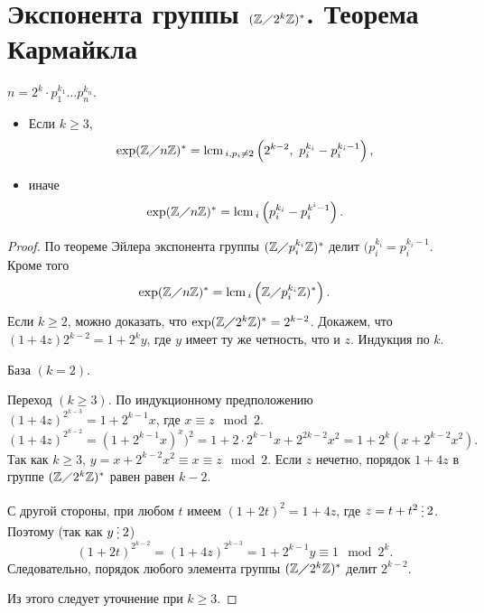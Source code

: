 \documentclass[11pt]{book}
\newcommand{\Z}{\mathbb{Z}}
\newcommand{\po}{\diagup}
\newcommand{\lcm}{{\mathop{\text{\rm lcm}}\,}}
\newcommand{\del}{{\:\small \raisebox{-2pt}{\vdots}\:}}
\renewcommand{\ge}{\geqslant}
\theoremstyle{definition}
\theoremstyle{plain}
\theoremstyle{plain}
\theoremstyle{definition}
\theoremstyle{remark}
\begin{document}
 \section{Экспонента группы $ (\Z \po 2^{k}\Z)^{*}$. Теорема Кармайкла }
 \begin{thm}[Кармайкла]
     $ n = 2^{k} \cdot p_1^{k_1} \ldots p_n^{k_n}$.
     \begin{itemize}
	 \item Если  $ k \ge 3$,
      \[
	  \exp (\Z \po n\Z)^{*} = \lcm_{i, p_i \ne 2}\left(2^{k-2},~ p_i^{k_i} - p_i^{k_i-1}\right)
     ,\] 
 \item иначе
     \[
	 \exp (\Z \diagup n \Z)^{*}= \lcm _i \left(p_i^{k_i} - p_i^{k^{i}-1}\right)
     .\] 
     \end{itemize}
 \end{thm}
 \begin{proof}
     По теореме Эйлера экспонента группы $ (\Z\po p_{i}^{k_i} \Z)^{*}$ делит $ (p_i^{k_i} = p_{i}^{k_i -1}$. Кроме того 
     \[
     \exp (\Z\po n\Z)^{*} = \lcm_i \left(\Z \po p_{i}^{k_i}\Z)^{*}\right)
     .\] 
     Если $ k \ge 2$, можно доказать, что $ \exp (\Z\po 2^{k}\Z)^{*}  = 2^{k-2}$.
     Докажем, что $ (1 + 4z)2^{k-2} = 1+2^{k} y$, где $ y$  имеет ту же четность, что и $ z$.
     Индукция по $ k$.
      \begin{description}
	  \item База $ (k = 2)$.
	  \item Переход $ (k \ge 3)$.
	      По индукционному предположению $ (1+4z)^{2^{k-3}} = 1 + 2^{k-1}x$, где $ x \equiv z \mod 2$.
	      \[
		  (1+4z)^{2^{k-2}} = (1+ 2^{k-1}x)^{x})^2 = 1 + 2 \cdot 2 ^{k-1} x + 2^{2k-2} x^2 = 1 + 2^{k}(x + 2 ^{k-2}x^2)
	      .\] 
	      Так как $ k \ge 3$, $ y = x + 2^{k-2} x^2 \equiv x \equiv z \mod 2$. Если $ z $ нечетно, порядок  $ 1 + 4z$ в группе $ (\Z \po 2^{k}\Z)^{*}$ равен  равен $ k-2$.

	      С другой стороны, при любом  $ t$ имеем  $ (1 + 2t)^2 = 1 + 4 z$, где $ z = t +t^2 \del 2$. Поэтому (так как $ y \del 2$)
	      \[
	      (1+2t)^{2^{k-2}} = (1+ 4z)^{2^{k-3}} = 1 + 2 ^{k-1} y \equiv 1 \mod 2^{k}
	      .\] 
	      Следовательно, порядок любого элемента группы $ (\Z \po 2^{k}\Z)^{*}$ делит $ 2^{k-2}$.
     \end{description}
     Из этого следует уточнение при $ k \ge  3$.
 \end{proof}
\end{document}
